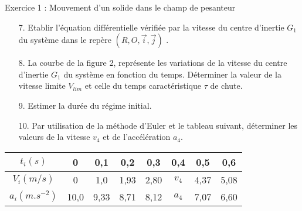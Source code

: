 \documentclass[12pt, french]{article}
\begin{document}
\begin{Box2}{Exercice 1 : Mouvement d’un solide dans le champ de pesanteur }
\begin{enumerate}
	\item[7.] Etablir l’équation différentielle vérifiée par la vitesse du centre d’inertie $G_1$ du
		système dans le repère $(R,O,\vec{i}, \vec{j})$ .

	\item[8.] La courbe de la figure 2, représente les variations de la vitesse du centre
d’inertie $G_1$ du système en fonction du temps. Déterminer la valeur de la vitesse
limite $V_{lim}$ et celle du temps caractéristique $\tau$ de chute.
\item[9.] Estimer la durée du régime initial.
\item[10.]  Par utilisation de la méthode d’Euler et le tableau suivant, déterminer les valeurs
de la vitesse $v_4$ et de l’accélération $a_4$.


\end{enumerate}

\begin{center}
\begin{tabular}{ |c|c|c|c|c|c|c|c| } 
 \hline
 $t_i(s)$		 & 0&0,1 &0,2& 0,3& 0,4& 0,5& 0,6\\\hline
 $V_i(m/s)$      &0 & 1,0 & 1,93 & 2,80 &$v_4$&4,37&5,08\\\hline 
 $a_i(m.s^{-2})$ & 10,0& 9,33 & 8,71 &8,12&$a_4$&7,07& 6,60\\\hline  
 \hline
\end{tabular}
\end{center}
 
 
 
   \end{Box2}
\end{document}
